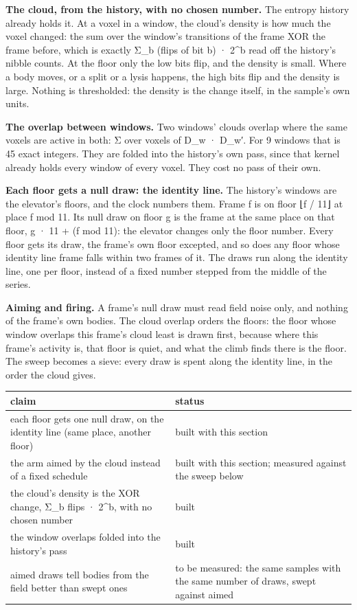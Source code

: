 \textbf{The cloud, from the history, with no chosen number.} The entropy history already holds it. At a voxel in a window, the cloud's density is how much the voxel changed: the sum over the window's transitions of the frame XOR the frame before, which is exactly Σ\_\allowbreak{}b (flips of bit b) · 2\textasciicircum{}b read off the history's nibble counts. At the floor only the low bits flip, and the density is small. Where a body moves, or a split or a lysis happens, the high bits flip and the density is large. Nothing is thresholded: the density is the change itself, in the sample's own units.

\textbf{The overlap between windows.} Two windows' clouds overlap where the same voxels are active in both: Σ over voxels of D\_\allowbreak{}w · D\_\allowbreak{}w′. For 9 windows that is 45 exact integers. They are folded into the history's own pass, since that kernel already holds every window of every voxel. They cost no pass of their own.

\textbf{Each floor gets a null draw: the identity line.} The history's windows are the elevator's floors, and the clock numbers them. Frame f is on floor ⌊f / 11⌋ at place f mod 11. Its null draw on floor g is the frame at the same place on that floor, g · 11 + (f mod 11): the elevator changes only the floor number. Every floor gets its draw, the frame's own floor excepted, and so does any floor whose identity line frame falls within two frames of it. The draws run along the identity line, one per floor, instead of a fixed number stepped from the middle of the series.

\textbf{Aiming and firing.} A frame's null draw must read field noise only, and nothing of the frame's own bodies. The cloud overlap orders the floors: the floor whose window overlaps this frame's cloud least is drawn first, because where this frame's activity is, that floor is quiet, and what the climb finds there is the floor. The sweep becomes a sieve: every draw is spent along the identity line, in the order the cloud gives.

{\small
\setlength{\tabcolsep}{6pt}
\begin{longtable}{>{\RaggedRight\arraybackslash}p{}>{\RaggedRight\arraybackslash}p{}}
\toprule
claim & status \\
\midrule
\endhead
each floor gets one null draw, on the identity line (same place, another floor) & built with this section \\
the arm aimed by the cloud instead of a fixed schedule & built with this section; measured against the sweep below \\
the cloud's density is the XOR change, Σ\_\allowbreak{}b flips · 2\textasciicircum{}b, with no chosen number & built \\
the window overlaps folded into the history's pass & built \\
aimed draws tell bodies from the field better than swept ones & to be measured: the same samples with the same number of draws, swept against aimed \\
\bottomrule
\end{longtable}
}
